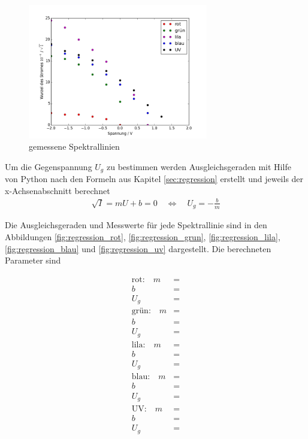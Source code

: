 \begin{figure}[h!]
	\centering
	\includegraphics[width=0.7\textwidth]{build/AlleWellenlangen.png}
	\caption{gemessene Spektrallinien}
	\label{fig:spektrallinien}
\end{figure}

\clearpage
Um die Gegenspannung $U_g$ zu bestimmen werden Ausgleichsgeraden mit Hilfe von Python nach den Formeln aus Kapitel \ref{sec:regression} erstellt und jeweils der x-Achsenabschnitt berechnet
\begin{align}
	\sqrt{I} = mU +b = 0\quad  \Leftrightarrow 	\quad U_g = - \frac{b}{m}
\end{align}	

Die Ausgleichsgeraden und Messwerte für jede Spektrallinie sind in den Abbildungen \ref{fig:regression_rot}, \ref{fig:regression_grun}, \ref{fig:regression_lila}, \ref{fig:regression_blau} und \ref{fig:regression_uv} dargestellt. Die berechneten Parameter sind

\begin{align*}
	\text{rot:} \quad m &=  \\
	b &=  \\
	U_g &=  \\[1em]
	\text{grün:} \quad m &=  \\
	b &=  \\
	U_g &=  \\[1em]
	\text{lila:} \quad m &=  \\
	b &=  \\
	U_g &=  \\[1em]
	\text{blau:} \quad m &=  \\
	b &=  \\
	U_g &=  \\[1em]
	\text{UV:} \quad m &=  \\
	b &=  \\
	U_g &= 
\end{align*}












